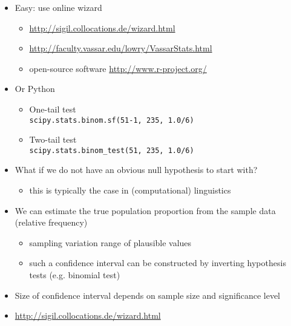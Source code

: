 \documentclass[a4paper,landscape,headrule,footrule,xetex]{foils}
\begin{document}
\begin{itemize}
\item Easy: use online wizard
  \begin{itemize}
  \item \url{http://sigil.collocations.de/wizard.html}
  \item \url{http://faculty.vassar.edu/lowry/VassarStats.html}
  \item open-source software \url{http://www.r-project.org/}
\end{itemize}
\item Or Python
  \begin{itemize}
  \item One-tail test 
    \\ \texttt{scipy.stats.binom.sf(51-1, 235, 1.0/6)}
  \item Two-tail test
    \\ \texttt{scipy.stats.binom\_test(51, 235, 1.0/6)}
  \end{itemize}
\end{itemize}


 \begin{itemize}
 \item What if we do not have an obvious    null hypothesis to start with?
   \begin{itemize}
 \item this is typically the case in (computational) linguistics
 \end{itemize}
\item We can estimate the true population proportion
from the sample data (relative frequency)
\begin{itemize}
\item sampling variation \into range of plausible values
\item such a confidence interval can be constructed by
inverting hypothesis tests (e.g. binomial test)
\end{itemize}
\item Size of confidence interval depends on sample
size and significance level
\item \url{http://sigil.collocations.de/wizard.html}
\end{itemize}
\end{document}
